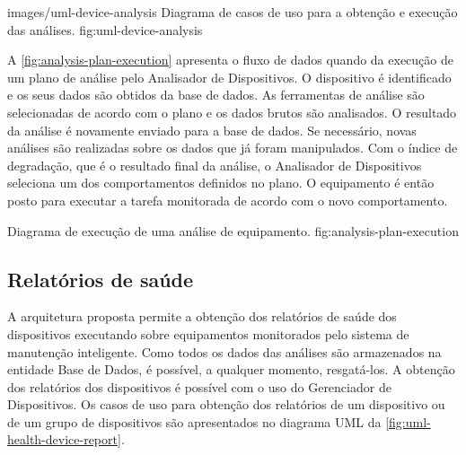   {images/uml-device-analysis}
  {Diagrama de casos de uso para a obtenção e execução das análises.}
  {fig:uml-device-analysis}

A \cref{fig:analysis-plan-execution} apresenta o fluxo de dados quando da execução de um plano de
análise pelo Analisador de Dispositivos. O dispositivo é identificado e os seus dados são obtidos da
base de dados. As ferramentas de análise são selecionadas de acordo com o plano e os dados brutos
são analisados. O resultado da análise é novamente enviado para a base de dados. Se necessário,
novas análises são realizadas sobre os dados que já foram manipulados. Com o índice de degradação,
que é o resultado final da análise, o Analisador de Dispositivos seleciona um dos comportamentos
definidos no plano. O equipamento é então posto para executar a tarefa monitorada de acordo com o
novo comportamento.

  {Diagrama de execução de uma análise de equipamento.}
  {fig:analysis-plan-execution}


%
%


\subsection{Relatórios de saúde}

A arquitetura proposta permite a obtenção dos relatórios de saúde dos dispositivos executando sobre
equipamentos monitorados pelo sistema de manutenção inteligente. Como todos os dados das análises
são armazenados na entidade Base de Dados, é possível, a qualquer momento, resgatá-los. A obtenção
dos relatórios dos dispositivos é possível com o uso do Gerenciador de Dispositivos. Os casos de uso
para obtenção dos relatórios de um dispositivo ou de um grupo de dispositivos são apresentados no
diagrama \gls{UML} da \cref{fig:uml-health-device-report}.

